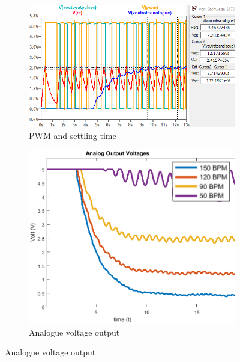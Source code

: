 \begin{figure}[h]
 \footnotesize
   \centering
   \begin{subfigure}[]{0.57\textwidth}
        \includegraphics[width=\linewidth]{./Figures/pwm}
	  \caption{PWM and settling time} 
	  \label{subfig:pwm}	
   \end{subfigure}
   \begin{subfigure}[]{0.41\textwidth}
  	 \includegraphics[width=\linewidth]{./Figures/analog}
	  \caption{Analogue voltage output} 
	  \label{subfig:analog}	
   \end{subfigure}
 \end{figure}


